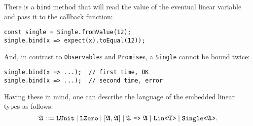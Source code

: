 There is a \texttt{bind} method that will read the value of the eventual linear variable and pass it to the callback function:

\begin{verbatim}
const single = Single.fromValue(12);
single.bind(x => expect(x).toEqual(12));
\end{verbatim}

And, in contrast to \texttt{Observable}s and \texttt{Promise}s, a \texttt{Single} cannot be bound twice:

\begin{verbatim}
single.bind(x => ...);  // first time, OK
single.bind(x => ...);  // second time, error
\end{verbatim}

Having these in mind, one can describe the language of the embedded linear types as follows:
\[
\mathfrak{A} ::= \mathtt{LUnit} \mid \mathtt{LZero} \mid \mathtt{[}\mathfrak{A}, \mathfrak{A}\mathtt{]} \mid \mathfrak{A}\mbox{~\texttt{=>}~} \mathfrak{A} \mid \mbox{\texttt{Lin<}}\mathfrak{T}\mbox{\texttt{>}} \mid \mbox{\texttt{Single<}}\mathfrak{A}\mbox{\texttt{>}}.
\]